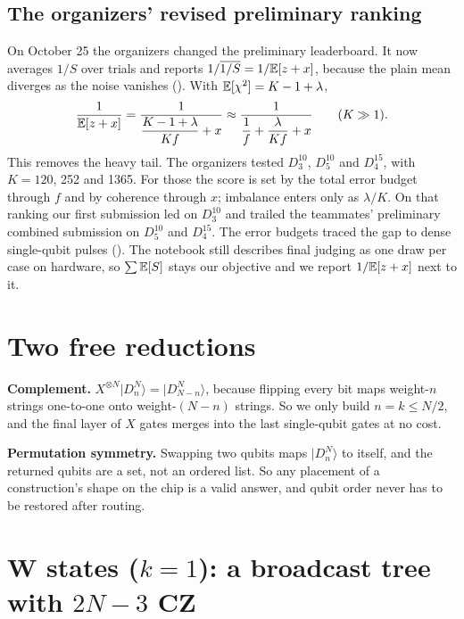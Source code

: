 \documentclass[11pt]{scrartcl}
\newcommand{\ket}[1]{\lvert #1\rangle}
\newcommand{\D}[2]{D^{#1}_{#2}}
\begin{document}
\subsection{The organizers' revised preliminary ranking}

On October 25 the organizers changed the preliminary leaderboard. It now averages $1/S$ over
trials and reports $1/\overline{1/S}=1/\mathbb E[z+x]$, because the plain mean diverges as the noise
vanishes (). With $\mathbb E[\chi^2]=K-1+\lambda$,
\[
  \frac{1}{\mathbb E[z+x]}=\frac{1}{\dfrac{K-1+\lambda}{Kf}+x}\approx\frac{1}{\dfrac1f+\dfrac{\lambda}{Kf}+x}
  \qquad(K\gg1).
\]
This removes the heavy tail. The organizers tested $\D{10}3$, $\D{10}5$ and $\D{15}4$, with
$K=120$, 252 and 1365. For those the score is set by the total error budget through $f$ and by
coherence through $x$; imbalance enters only as $\lambda/K$. On that ranking our first submission
led on $\D{10}3$ and trailed the teammates' preliminary combined submission on $\D{10}5$ and
$\D{15}4$. The error budgets traced the gap to dense single-qubit pulses (). The
notebook still describes final judging as one draw per case on hardware, so $\sum\mathbb E[S]$ stays our
objective and we report $1/\mathbb E[z+x]$ next to it.

\section{Two free reductions}\label{sec:reductions}

\textbf{Complement.} $X^{\otimes N}\ket{\D Nn}=\ket{\D N{N-n}}$, because flipping every bit maps
weight-$n$ strings one-to-one onto weight-$(N-n)$ strings. So we only build $n=k\le N/2$, and the
final layer of $X$ gates merges into the last single-qubit gates at no cost.

\textbf{Permutation symmetry.} Swapping two qubits maps $\ket{\D Nn}$ to itself, and the returned
qubits are a set, not an ordered list. So any placement of a construction's shape on the chip is a
valid answer, and qubit order never has to be restored after routing.

\section{W states (\texorpdfstring{$k=1$}{k=1}): a broadcast tree with \texorpdfstring{$2N-3$}{2N-3} CZ}\label{sec:w}
\end{document}
